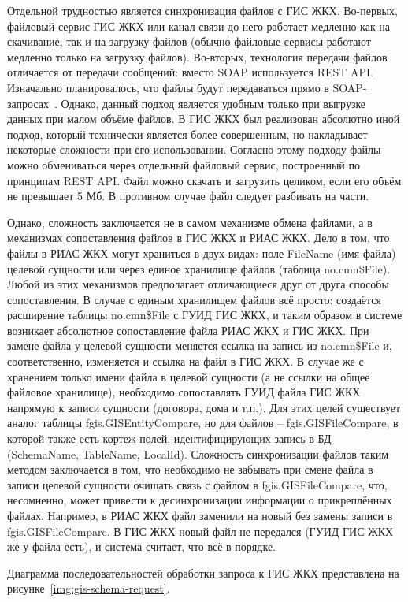 Отдельной трудностью является синхронизация файлов с ГИС ЖКХ.
Во-первых, файловый сервис ГИС ЖКХ или канал связи до него работает медленно как на скачивание, так и на загрузку файлов (обычно файловые сервисы работают медленно только на загрузку файлов).
Во-вторых, технология передачи файлов отличается от передачи сообщений: вместо SOAP используется REST API.
Изначально планировалось, что файлы будут передаваться прямо в SOAP-запросах~\cite{gis_doc_tff}.
Однако, данный подход является удобным только при выгрузке данных при малом объёме файлов.
В ГИС ЖКХ был реализован абсолютно иной подход, который технически является более совершенным, но накладывает некоторые сложности при его использовании.
Согласно этому подходу файлы можно обмениваться через отдельный файловый сервис, построенный по принципам REST API.
Файл можно скачать и загрузить целиком, если его объём не превышает 5 Мб.
В противном случае файл следует разбивать на части.

Однако, сложность заключается не в самом механизме обмена файлами, а в механизмах сопоставления файлов в ГИС ЖКХ и РИАС ЖКХ.
Дело в том, что файлы в РИАС ЖКХ могут храниться в двух видах: поле FileName (имя файла) целевой сущности или через единое хранилище файлов (таблица no.cmn\$File).
Любой из этих механизмов предполагает отличающиеся друг от друга способы сопоставления.
В случае с единым хранилищем файлов всё просто: создаётся расширение таблицы no.cmn\$File с ГУИД ГИС ЖКХ, и таким образом в системе возникает абсолютное сопоставление файла РИАС ЖКХ и ГИС ЖКХ.
При замене файла у целевой сущности меняется ссылка на запись из no.cmn\$File и, соответственно, изменяется и ссылка на файл в ГИС ЖКХ.
В случае же с хранением только имени файла в целевой сущности (а не ссылки на общее файловое хранилище), необходимо сопоставлять ГУИД файла ГИС ЖКХ напрямую к записи сущности (договора, дома и т.п.).
Для этих целей существует аналог таблицы fgis.GISEntityCompare, но для файлов -- fgis.GISFileCompare, в которой также есть кортеж полей, идентифицирующих запись в БД (SchemaName, TableName, LocalId).
Сложность синхронизации файлов таким методом заключается в том, что необходимо не забывать при смене файла в записи целевой сущности очищать связь с файлом в fgis.GISFileCompare, что, несомненно, может привести к десинхронизации информации о прикреплённых файлах.
Например, в РИАС ЖКХ файл заменили на новый без замены записи в fgis.GISFileCompare.
В ГИС ЖКХ новый файл не передался (ГУИД ГИС ЖКХ же у файла есть), и система считает, что всё в порядке.

Диаграмма последовательностей обработки запроса к ГИС ЖКХ представлена на рисунке~\ref{img:gis-schema-request}.

